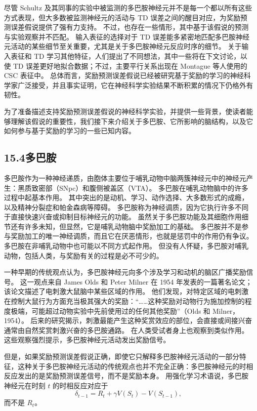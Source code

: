 \documentclass[UTF8,12pt,a4paper,fontset=fandol]{ctexart}
\begin{document}
尽管 Schultz 及其同事的实验中被监测的多巴胺神经元并不是每一个都以所有这些方式表现，但大多数被监测神经元的活动与 TD 误差之间的醒目对应，为奖励预测误差假说提供了强有力支持。
不过，也存在一些情形，其中基于该假说的预测与实验观察并不匹配。
输入表征的选择对于 TD 误差能多紧密地匹配多巴胺神经元活动的某些细节至关重要，尤其是关于多巴胺神经元反应时序的细节。
关于输入表征和 TD 学习其他特征，人们提出了不同想法，其中一些将在下文讨论，以使 TD 误差更好地拟合数据；不过，主要平行关系出现在 Montague 等人使用的 CSC 表征中。
总体而言，奖励预测误差假说已经被研究基于奖励的学习的神经科学家广泛接受，并且事实证明，它在神经科学实验结果不断积累的情况下仍格外有韧性。

为了准备描述支持奖励预测误差假说的神经科学实验，并提供一些背景，使读者能够理解该假说的重要性，我们接下来介绍关于多巴胺、它所影响的脑结构，以及它如何参与基于奖励的学习的一些已知内容。

\subsection*{15.4\quad 多巴胺}

多巴胺作为一种神经递质，由胞体主要位于哺乳动物中脑两簇神经元中的神经元产生：黑质致密部（SNpc）和腹侧被盖区（VTA）。
多巴胺在哺乳动物脑中的许多过程中起基本作用。
其中突出的是动机、学习、动作选择、大多数形式的成瘾，以及精神分裂症和帕金森病等障碍。
多巴胺称为神经调质，因为它执行许多不同于直接快速兴奋或抑制目标神经元的功能。
虽然关于多巴胺功能及其细胞作用细节还有许多未知，但显然，它是哺乳动物脑中奖励加工的基础。
多巴胺并不是参与奖励加工的唯一神经调质，而且它在厌恶情形，也就是惩罚中的作用仍有争议。
多巴胺在非哺乳动物中也可能以不同方式起作用。
但没有人怀疑，多巴胺对哺乳动物，包括人类，与奖励有关的过程是必不可少的。

一种早期的传统观点认为，多巴胺神经元向多个涉及学习和动机的脑区广播奖励信号。
这一观点来自 James Olds 和 Peter Milner 在 1954 年发表的一篇著名论文；该论文描述了电刺激大鼠脑中某些区域的作用。
他们发现，对特定区域的电刺激在控制大鼠行为方面充当极其强大的奖励：“……这种奖励对动物行为施加控制的程度极端，可能超过动物实验中先前使用过的任何其他奖励”（Olds 和 Milner，1954）。
后来的研究揭示，刺激最能产生这种奖赏效应的部位，会直接或间接兴奋通常由自然奖赏刺激兴奋的多巴胺通路。
在人类受试者身上也观察到类似作用。
这些观察强烈提示，多巴胺神经元活动发出奖励信号。

但是，如果奖励预测误差假说正确，即使它只解释多巴胺神经元活动的一部分特征，这种关于多巴胺神经元活动的传统观点也并不完全正确：多巴胺神经元的时相反应发出的是奖励预测误差信号，而不是奖励本身。
用强化学习术语说，多巴胺神经元在时刻 $t$ 的时相反应对应于
\[
\delta_{t-1}=R_t+\gamma V(S_t)-V(S_{t-1}),
\]
而不是 $R_t$。
\end{document}
